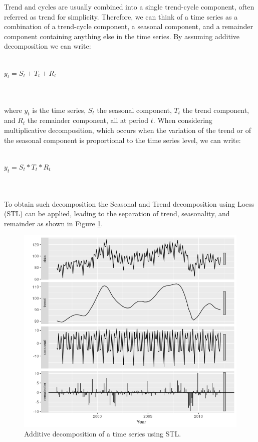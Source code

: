\documentclass[a4paper, 12pt]{article} %
\begin{document}
	Trend and cycles are usually combined into a single trend-cycle component, often referred as trend for simplicity.
	Therefore, we can think of a time series as a combination of a trend-cycle component, a seasonal component, and a remainder component containing anything else in the time series.
	By assuming additive decomposition we can write:\\\\
	\centerline{$y_t = S_t + T_t + R_t$}\\\\
	where $y_t$ is the time series, $S_t$ the seasonal component, $T_t$ the trend component, and $R_t$ the remainder component, all at period $t$. When considering multiplicative decomposition, which occurs when the variation of the trend or of the seasonal component is proportional to the time series level, we can write: \\\\
	\centerline{$y_t = S_t * T_t * R_t$}\\\\
	To obtain such decomposition the Seasonal and Trend decomposition using Loess (STL) \cite{STL} can be applied, leading to the separation of trend, seasonality, and remainder as shown in Figure \ref{fig:stl}.
	\begin{figure}
		\includegraphics[width=\linewidth]{img/sota_ts_additive_decomposition.png}
		\caption{Additive decomposition of a time series using STL.}
		\label{fig:stl}
	\end{figure}
	
\end{document}
